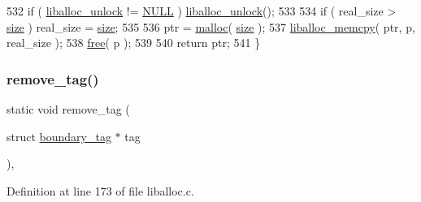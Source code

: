 \begin{DoxyCode}
532     \textcolor{keywordflow}{if} ( \hyperlink{a00026_aedc23f198b2882d41d0caa316453967b_aedc23f198b2882d41d0caa316453967b}{liballoc\_unlock} != \hyperlink{a00026_a070d2ce7b6bb7e5c05602aa8c308d0c4_a070d2ce7b6bb7e5c05602aa8c308d0c4}{NULL} ) \hyperlink{a00026_aedc23f198b2882d41d0caa316453967b_aedc23f198b2882d41d0caa316453967b}{liballoc\_unlock}();
533 
534     \textcolor{keywordflow}{if} ( real\_size > \hyperlink{a00095_a29b056a39f6022d32468e7913e6df936_a29b056a39f6022d32468e7913e6df936}{size} ) real\_size = \hyperlink{a00095_a29b056a39f6022d32468e7913e6df936_a29b056a39f6022d32468e7913e6df936}{size};
535 
536     ptr = \hyperlink{a00023_a7ac38fce3243a7dcf448301ee9ffd392_a7ac38fce3243a7dcf448301ee9ffd392}{malloc}( \hyperlink{a00095_a29b056a39f6022d32468e7913e6df936_a29b056a39f6022d32468e7913e6df936}{size} );
537     \hyperlink{a00023_a58b3101a659b6a2f7e2ca290bef6bfb4_a58b3101a659b6a2f7e2ca290bef6bfb4}{liballoc\_memcpy}( ptr, p, real\_size );
538     \hyperlink{a00023_afbedc913aa4651b3c3b4b3aecd9b4711_afbedc913aa4651b3c3b4b3aecd9b4711}{free}( p );
539 
540     \textcolor{keywordflow}{return} ptr;
541 \}
\end{DoxyCode}
\mbox{\label{a00023_aeea23ead928f2a5d40fdf7687b3c99c9_aeea23ead928f2a5d40fdf7687b3c99c9}} 
\subsubsection{\texorpdfstring{remove\+\_\+tag()}{remove\_tag()}}
{\footnotesize\ttfamily static void remove\+\_\+tag (\begin{DoxyParamCaption}\item[{struct \hyperlink{a00095}{boundary\+\_\+tag} $\ast$}]{tag }\end{DoxyParamCaption})\hspace{0.3cm}{\ttfamily [inline]}, {\ttfamily [static]}}



Definition at line 173 of file liballoc.\+c.


